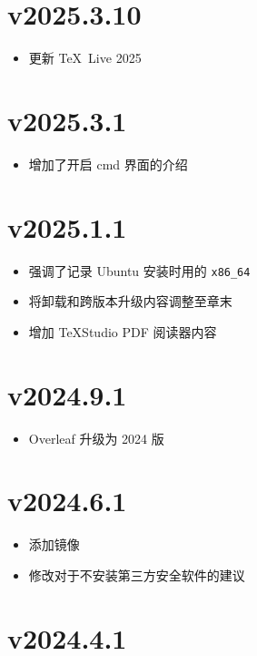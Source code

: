 \section*{v2025.3.10}

\begin{itemize}
  \item 更新 \TeX~Live 2025
\end{itemize}

\section*{v2025.3.1}

\begin{itemize}
  \item 增加了开启 \textsf{cmd} 界面的介绍
\end{itemize}

\section*{v2025.1.1}

\begin{itemize}
  \item 强调了记录 Ubuntu 安装时用的 \texttt{x86\_64}
  \item 将卸载和跨版本升级内容调整至章末
  \item 增加 \TeX Studio PDF 阅读器内容
\end{itemize}

\section*{v2024.9.1}

\begin{itemize}
  \item Overleaf 升级为 2024 版
\end{itemize}

\section*{v2024.6.1}

\begin{itemize}
  \item 添加镜像
  \item 修改对于不安装第三方安全软件的建议
\end{itemize}

\section*{v2024.4.1}

